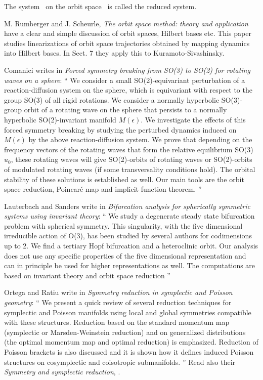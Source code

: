 \begin{description}
                                    \toCB
The system \mapRed\ on the orbit space \pSRed\ is called the reduced system.

M. Rumberger and J. Scheurle,
{\emph{The orbit space method:}}
\emph{theory and application}
have a clear and simple discussion of orbit spaces,
Hilbert bases etc. This paper studies linearizations of orbit space
trajectories obtained by mapping dynamics into Hilbert bases.
In Sect. 7 they apply this to Kuramoto-Sivashinsky.

Comanici writes in \emph{Forced symmetry breaking from SO(3) to SO(2) for rotating
            waves on a sphere}: ``
We consider a small SO(2)-equivariant perturbation of a
reaction-diffusion system on the sphere, which is equivariant with
respect to the group SO(3) of all rigid rotations. We consider a normally
hyperbolic SO(3)-group orbit of a rotating wave on the sphere that
persists to a normally hyperbolic SO(2)-invariant manifold $M(\epsilon)$.
We investigate the effects of this forced symmetry breaking by studying
the perturbed dynamics induced on $M(\epsilon)$ by the above
reaction-diffusion system. We prove that depending on the frequency
vectors of the rotating waves that form the relative equilibrium
SO(3) $u_{0}$, these rotating waves will give SO(2)-orbits of rotating waves
or SO(2)-orbits of modulated rotating waves (if some transversality
conditions hold). The orbital stability of these solutions is established
as well. Our main tools are the orbit space reduction, Poincar\'e map and
implicit function theorem.
''

Lauterbach and Sanders write in \emph{Bifurcation analysis for
spherically symmetric systems using invariant theory}: ``
We study a degenerate steady state bifurcation problem with spherical
symmetry. This singularity, with the five dimensional irreducible action
of O(3), has been studied by several authors for codimensions up to 2.
We find a tertiary Hopf bifurcation and a
heteroclinic orbit. Our analysis does not use any specific properties of
the five dimensional representation and can in principle be used for
higher representations as well. The computations are based on invariant
theory and orbit space reduction
''

Ortega and Ratiu write in
\emph{Symmetry reduction in symplectic and {Poisson} geometry}: ``
We present a quick review of several reduction techniques for symplectic
and Poisson manifolds using local and global symmetries compatible with
these structures. Reduction based on the standard momentum map
(symplectic or Marsden-Weinstein reduction) and on generalized
distributions (the optimal momentum map and optimal reduction) is
emphasized. Reduction of Poisson brackets is also discussed and it is
shown how it defines induced Poisson structures on cosymplectic and
coisotropic submanifolds.
''
Read also their \emph{Symmetry and symplectic reduction}, .


\end{description}
